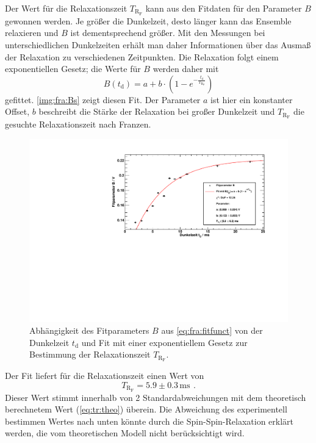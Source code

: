 Der Wert für die Relaxationszeit $T_{\text{R}_\text{F}}$ kann aus den Fitdaten für den Parameter $B$ gewonnen werden.
Je größer die Dunkelzeit, desto länger kann das Ensemble relaxieren und $B$ ist dementsprechend größer.
Mit den Messungen bei unterschiedlichen Dunkelzeiten erhält
man daher Informationen über das Ausmaß der Relaxation zu
verschiedenen Zeitpunkten.
Die Relaxation folgt einem exponentiellen Gesetz; die Werte für $B$ werden daher mit
\begin{equation}
    B(t_\text{d})= a + b \cdot \left(1 - e^{-\frac{t_\text{d}}{T_{\text{R}_\text{F}}}}\right)
\end{equation}
gefittet.
\autoref{img:fra:Bs} zeigt diesen Fit. Der Parameter $a$ ist hier ein konstanter Offset,
$b$ beschreibt die Stärke der Relaxation bei großer Dunkelzeit und
$T_{\text{R}_\text{F}}$ die gesuchte Relaxationszeit nach Franzen.

\begin{figure}[H]
    \begin{center}
        \includegraphics[width=\textwidth]{../img/part6/BFit.pdf}
        \caption{Abhängigkeit des Fitparameters $B$ aus \autoref{eq:fra:fitfunct} von der Dunkelzeit $t_\text{d}$ und Fit
        mit einer exponentiellem Gesetz zur Bestimmung der Relaxationszeit $T_{\text{R}_\text{F}}$.}
        \label{img:fra:Bs}
    \end{center}
\end{figure}

Der Fit liefert für die Relaxationszeit einen Wert von
\begin{equation}
    T_{\text{R}_\text{F}} = 5.9 \pm 0.3 \,\text{ms}  \ \, .
\end{equation}
Dieser Wert stimmt innerhalb von 2 Standardabweichungen mit dem theoretisch berechnetem Wert (\autoref{eq:tr:theo}) überein. 
Die Abweichung des experimentell bestimmen Wertes nach unten könnte durch die Spin-Spin-Relaxation erklärt werden, die vom theoretischen Modell 
nicht berücksichtigt wird.